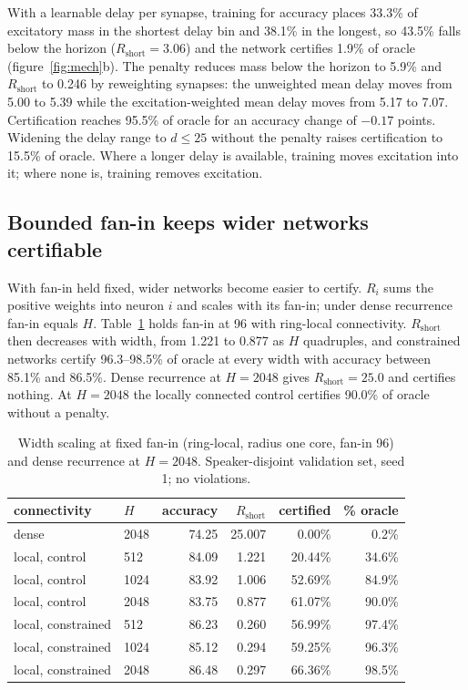 \documentclass{iopjournal}
\begin{document}
With a learnable delay per synapse, training for accuracy places 33.3\% of excitatory mass in the shortest delay bin and 38.1\% in the longest, so 43.5\% falls below the horizon ($R_{\mathrm{short}}=3.06$) and the network certifies 1.9\% of oracle (figure~\ref{fig:mech}b). The penalty reduces mass below the horizon to 5.9\% and $R_{\mathrm{short}}$ to 0.246 by reweighting synapses: the unweighted mean delay moves from 5.00 to 5.39 while the excitation-weighted mean delay moves from 5.17 to 7.07. Certification reaches 95.5\% of oracle for an accuracy change of $-0.17$ points. Widening the delay range to $d\le25$ without the penalty raises certification to 15.5\% of oracle. Where a longer delay is available, training moves excitation into it; where none is, training removes excitation.

\subsection{Bounded fan-in keeps wider networks certifiable}
\label{sec:scale}

With fan-in held fixed, wider networks become easier to certify. $R_i$ sums the positive weights into neuron $i$ and scales with its fan-in; under dense recurrence fan-in equals $H$. Table~\ref{tab:scale} holds fan-in at 96 with ring-local connectivity. $R_{\mathrm{short}}$ then decreases with width, from 1.221 to 0.877 as $H$ quadruples, and constrained networks certify 96.3--98.5\% of oracle at every width with accuracy between 85.1\% and 86.5\%. Dense recurrence at $H=2048$ gives $R_{\mathrm{short}}=25.0$ and certifies nothing. At $H=2048$ the locally connected control certifies 90.0\% of oracle without a penalty.

\begin{table}
\caption{\label{tab:scale}Width scaling at fixed fan-in (ring-local, radius one core, fan-in 96) and dense recurrence at $H=2048$. Speaker-disjoint validation set, seed 1; no violations.}
\centering
\begin{tabular}{llrrrr}
\hline
connectivity & $H$ & accuracy & $R_{\mathrm{short}}$ & certified & \% oracle \\
\hline
dense                & 2048 & 74.25 & 25.007 & 0.00\%  & 0.2\% \\
\hline
local, control       &  512 & 84.09 & 1.221 & 20.44\% & 34.6\% \\
local, control       & 1024 & 83.92 & 1.006 & 52.69\% & 84.9\% \\
local, control       & 2048 & 83.75 & 0.877 & 61.07\% & 90.0\% \\
\hline
local, constrained   &  512 & 86.23 & 0.260 & 56.99\% & 97.4\% \\
local, constrained   & 1024 & 85.12 & 0.294 & 59.25\% & 96.3\% \\
local, constrained   & 2048 & 86.48 & 0.297 & 66.36\% & 98.5\% \\
\hline
\end{tabular}
\end{table}
\end{document}

